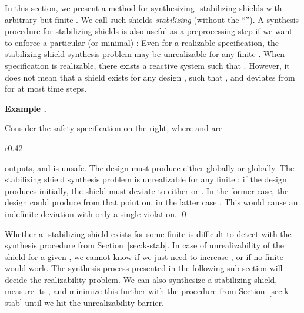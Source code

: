 \documentclass{llncs}
\newcounter{exacounter}
\newenvironment{exa}{
\refstepcounter{exacounter}
\smallskip\noindent
\textbf{Example \theexacounter.}
}{\vspace{2mm}}
\newcommand{\nd}{3cm} \tikzset{initial text={}}
\begin{document}
In this section, we present a method for synthesizing -stabilizing 
shields with arbitrary but finite .  We call such shields 
\emph{stabilizing} (without the ``'').  A synthesis procedure for 
stabilizing shields is also useful as a preprocessing step if we want to 
enforce a particular (or minimal) : Even for a realizable 
specification, the -stabilizing shield synthesis problem may be 
unrealizable for any finite .  When specification  is 
realizable, there exists a reactive system  such that 
.  However, it does not mean that a shield 
 exists for any design , such that , and  deviates from 
 for at most  time steps.

\begin{exa}
Consider the safety specification on the right, where  and  
are 
\begin{wrapfigure}[6]{r}{0.42\textwidth}
\vspace{-1.0cm}
%
 \end{wrapfigure}
outputs, and  is unsafe.  The design must produce either  globally or  globally.  The -stabilizing 
shield synthesis problem is unrealizable for any finite : if the 
design produces  initially, the shield must deviate to 
either  or .  In the former case, the 
design could produce  from that point on, in the latter case 
.  This would cause an indefinite deviation with 
only a single violation.  \qed

\end{exa}

Whether a -stabilizing shield exists for some finite  is difficult 
to detect with the synthesis procedure from Section~\ref{sec:k-stab}.  
In case of unrealizability of the shield for a given , we cannot know 
if we just need to increase , or if no finite  would work.  The 
synthesis process presented in the following sub-section will decide the 
realizability problem.  We can also synthesize a stabilizing shield, 
measure its , and minimize this  further with the procedure from 
Section~\ref{sec:k-stab} until we hit the unrealizability barrier.
\end{document}
